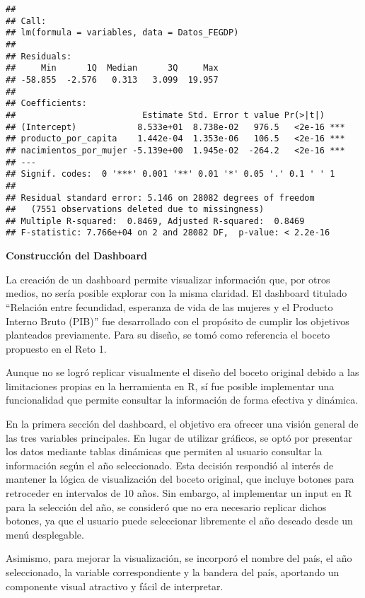 \documentclass[
]{article}
\begin{document}
\begin{verbatim}
## 
## Call:
## lm(formula = variables, data = Datos_FEGDP)
## 
## Residuals:
##     Min      1Q  Median      3Q     Max 
## -58.855  -2.576   0.313   3.099  19.957 
## 
## Coefficients:
##                         Estimate Std. Error t value Pr(>|t|)    
## (Intercept)            8.533e+01  8.738e-02   976.5   <2e-16 ***
## producto_por_capita    1.442e-04  1.353e-06   106.5   <2e-16 ***
## nacimientos_por_mujer -5.139e+00  1.945e-02  -264.2   <2e-16 ***
## ---
## Signif. codes:  0 '***' 0.001 '**' 0.01 '*' 0.05 '.' 0.1 ' ' 1
## 
## Residual standard error: 5.146 on 28082 degrees of freedom
##   (7551 observations deleted due to missingness)
## Multiple R-squared:  0.8469, Adjusted R-squared:  0.8469 
## F-statistic: 7.766e+04 on 2 and 28082 DF,  p-value: < 2.2e-16
\end{verbatim}

\textbf{Construcción del Dashboard}

La creación de un dashboard permite visualizar información que, por
otros medios, no sería posible explorar con la misma claridad. El
dashboard titulado ``Relación entre fecundidad, esperanza de vida de las
mujeres y el Producto Interno Bruto (PIB)'' fue desarrollado con el
propósito de cumplir los objetivos planteados previamente. Para su
diseño, se tomó como referencia el boceto propuesto en el Reto 1.

Aunque no se logró replicar visualmente el diseño del boceto original
debido a las limitaciones propias en la herramienta en R, sí fue posible
implementar una funcionalidad que permite consultar la información de
forma efectiva y dinámica.

En la primera sección del dashboard, el objetivo era ofrecer una visión
general de las tres variables principales. En lugar de utilizar
gráficos, se optó por presentar los datos mediante tablas dinámicas que
permiten al usuario consultar la información según el año seleccionado.
Esta decisión respondió al interés de mantener la lógica de
visualización del boceto original, que incluye botones para retroceder
en intervalos de 10 años. Sin embargo, al implementar un input en R para
la selección del año, se consideró que no era necesario replicar dichos
botones, ya que el usuario puede seleccionar libremente el año deseado
desde un menú desplegable.

Asimismo, para mejorar la visualización, se incorporó el nombre del
país, el año seleccionado, la variable correspondiente y la bandera del
país, aportando un componente visual atractivo y fácil de interpretar.
\end{document}
